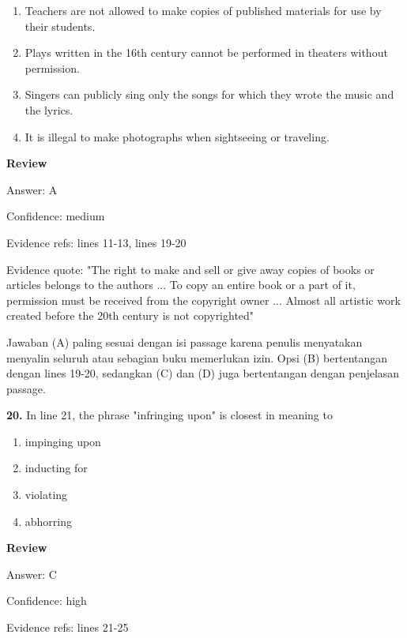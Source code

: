 \documentclass[12pt]{article}
\begin{document}
\begin{enumerate}[label=(\Alph*),leftmargin=*,itemsep=0.2em]
\item Teachers are not allowed to make copies of published materials for use by their students.
\item Plays written in the 16th century cannot be performed in theaters without permission.
\item Singers can publicly sing only the songs for which they wrote the music and the lyrics.
\item It is illegal to make photographs when sightseeing or traveling.
\end{enumerate}
\par
\begingroup
\setlength{\parskip}{0pt}
\setlength{\parindent}{0pt}
\textbf{Review}\par
Answer: A\par
Confidence: medium\par
Evidence refs: lines 11-13, lines 19-20\par
Evidence quote: "The right to make and sell or give away copies of books or articles belongs to the authors ... To copy an entire book or a part of it, permission must be received from the copyright owner ... Almost all artistic work created before the 20th century is not copyrighted"\par
Jawaban (A) paling sesuai dengan isi passage karena penulis menyatakan menyalin seluruh atau sebagian buku memerlukan izin. Opsi (B) bertentangan dengan lines 19-20, sedangkan (C) dan (D) juga bertentangan dengan penjelasan passage.\par
\endgroup
\par
\vspace{0.25\baselineskip}
\noindent\textbf{20.} In line 21, the phrase "infringing upon" is closest in meaning to
\begin{enumerate}[label=(\Alph*),leftmargin=*,itemsep=0.2em]
\item impinging upon
\item inducting for
\item violating
\item abhorring
\end{enumerate}
\par
\begingroup
\setlength{\parskip}{0pt}
\setlength{\parindent}{0pt}
\textbf{Review}\par
Answer: C\par
Confidence: high\par
Evidence refs: lines 21-25\par
\end{document}
